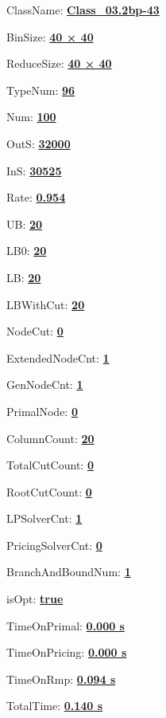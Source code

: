 \documentclass[11pt]{article}
\begin{document}
\pagestyle{empty}


ClassName: \underline{\textbf{Class_03.2bp-43}}
\par
BinSize: \underline{\textbf{40 × 40}}
\par
ReduceSize: \underline{\textbf{40 × 40}}
\par
TypeNum: \underline{\textbf{96}}
\par
Num: \underline{\textbf{100}}
\par
OutS: \underline{\textbf{32000}}
\par
InS: \underline{\textbf{30525}}
\par
Rate: \underline{\textbf{0.954}}
\par
UB: \underline{\textbf{20}}
\par
LB0: \underline{\textbf{20}}
\par
LB: \underline{\textbf{20}}
\par
LBWithCut: \underline{\textbf{20}}
\par
NodeCut: \underline{\textbf{0}}
\par
ExtendedNodeCnt: \underline{\textbf{1}}
\par
GenNodeCnt: \underline{\textbf{1}}
\par
PrimalNode: \underline{\textbf{0}}
\par
ColumnCount: \underline{\textbf{20}}
\par
TotalCutCount: \underline{\textbf{0}}
\par
RootCutCount: \underline{\textbf{0}}
\par
LPSolverCnt: \underline{\textbf{1}}
\par
PricingSolverCnt: \underline{\textbf{0}}
\par
BranchAndBoundNum: \underline{\textbf{1}}
\par
isOpt: \underline{\textbf{true}}
\par
TimeOnPrimal: \underline{\textbf{0.000 s}}
\par
TimeOnPricing: \underline{\textbf{0.000 s}}
\par
TimeOnRmp: \underline{\textbf{0.094 s}}
\par
TotalTime: \underline{\textbf{0.140 s}}
\par
\newpage


\end{document}
